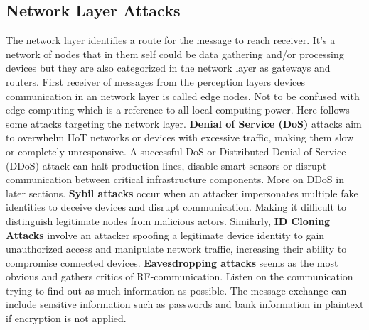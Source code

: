 \documentclass[article,a4paper]{IEEEtran}
\begin{document}
\subsection{Network Layer Attacks}
The network layer identifies a route for the message to reach receiver. It's a network of nodes that in them self could be data gathering and/or processing devices but they are also categorized in the network layer as gateways and routers. First receiver of messages from the perception layers devices communication in an network layer is called edge nodes. Not to be confused with edge computing which is a reference to all local computing power. Here follows some attacks targeting the network layer.   
\newline\newline
\textbf{Denial of Service (DoS)} attacks aim to overwhelm IIoT networks or devices with excessive traffic, making them slow or completely unresponsive. A successful DoS or Distributed Denial of Service (DDoS) attack can halt production lines, disable smart sensors or disrupt communication between critical infrastructure components. More on DDoS in later sections. 
\newline
\textbf{Sybil attacks} occur when an attacker impersonates multiple fake identities to deceive devices and disrupt communication. Making it difficult to distinguish legitimate nodes from malicious actors. Similarly, \textbf{ID Cloning Attacks} involve an attacker spoofing a legitimate device identity to gain unauthorized access and manipulate network traffic, increasing their ability to compromise connected devices. 
\newline
\textbf{Eavesdropping attacks} seems as the most obvious and gathers critics of RF-communication. Listen on the communication trying to find out as much information as possible. The message exchange can include sensitive information such as passwords and bank information in plaintext if encryption is not applied. 
\end{document}
